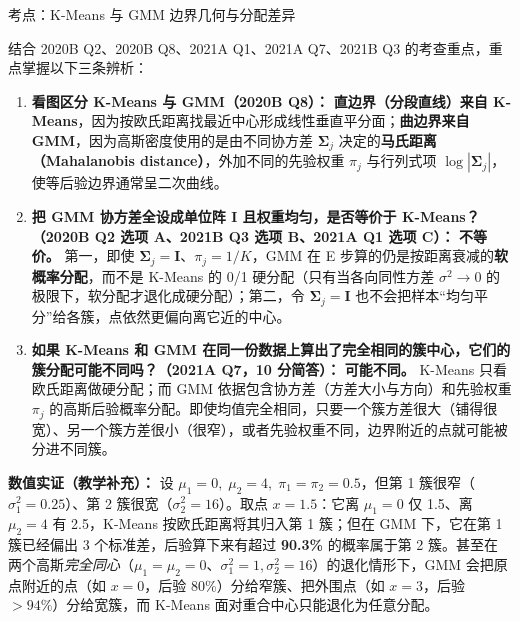 
考点：K-Means 与 GMM 边界几何与分配差异 


结合 2020B Q2、2020B Q8、2021A Q1、2021A Q7、2021B Q3 的考查重点，重点掌握以下三条辨析：
\begin{enumerate}
\item \textbf{看图区分 K-Means 与 GMM（2020B Q8）：} \textbf{直边界（分段直线）来自 K-Means}，因为按欧氏距离找最近中心形成线性垂直平分面；\textbf{曲边界来自 GMM}，因为高斯密度使用的是由不同协方差 $\boldsymbol{\Sigma}_j$ 决定的\textbf{马氏距离（Mahalanobis distance）}，外加不同的先验权重 $\pi_j$ 与行列式项 $\log|\boldsymbol{\Sigma}_j|$，使等后验边界通常呈二次曲线。
\item \textbf{把 GMM 协方差全设成单位阵 $\mathbf{I}$ 且权重均匀，是否等价于 K-Means？（2020B Q2 选项 A、2021B Q3 选项 B、2021A Q1 选项 C）：} \textbf{不等价。} 第一，即使 $\boldsymbol{\Sigma}_j=\mathbf{I}$、$\pi_j=1/K$，GMM 在 E 步算的仍是按距离衰减的\textbf{软概率分配}，而不是 K-Means 的 0/1 硬分配（只有当各向同性方差 $\sigma^2\to 0$ 的极限下，软分配才退化成硬分配）；第二，令 $\boldsymbol{\Sigma}_j=\mathbf{I}$ 也不会把样本“均匀平分”给各簇，点依然更偏向离它近的中心。
\item \textbf{如果 K-Means 和 GMM 在同一份数据上算出了完全相同的簇中心，它们的簇分配可能不同吗？（2021A Q7，10 分简答）：} \textbf{可能不同。} K-Means 只看欧氏距离做硬分配；而 GMM 依据包含协方差（方差大小与方向）和先验权重 $\pi_j$ 的高斯后验概率分配。即使均值完全相同，只要一个簇方差很大（铺得很宽）、另一个簇方差很小（很窄），或者先验权重不同，边界附近的点就可能被分进不同簇。
\end{enumerate}

\textbf{数值实证（教学补充）：} 设 $\mu_1=0,\;\mu_2=4,\;\pi_1=\pi_2=0.5$，但第 1 簇很窄（$\sigma_1^2=0.25$）、第 2 簇很宽（$\sigma_2^2=16$）。取点 $x=1.5$：它离 $\mu_1=0$ 仅 1.5、离 $\mu_2=4$ 有 2.5，K-Means 按欧氏距离将其归入第 1 簇；但在 GMM 下，它在第 1 簇已经偏出 $3$ 个标准差，后验算下来有超过 \textbf{90.3\%} 的概率属于第 2 簇。甚至在两个高斯\emph{完全同心}（$\mu_1=\mu_2=0$、$\sigma_1^2=1,\sigma_2^2=16$）的退化情形下，GMM 会把原点附近的点（如 $x=0$，后验 80\%）分给窄簇、把外围点（如 $x=3$，后验 $>94\%$）分给宽簇，而 K-Means 面对重合中心只能退化为任意分配。

